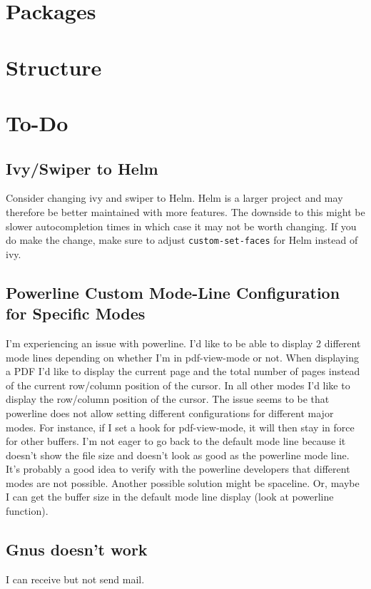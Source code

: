 \documentclass{default}
\begin{document}
\tableofcontents
\hypersetup{linkcolor=red}

\chapter{Packages}\label{cha:packages}


\chapter{Structure}\label{cha:structure}


\chapter{To-Do}\label{cha:to-do}

\section{Ivy/Swiper to Helm}\label{sec:ivyswiper-helm}

Consider changing ivy and swiper to Helm. Helm is a larger project and may therefore be better
maintained with more features. The downside to this might be slower autocompletion times in which
case it may not be worth changing. If you do make the change, make sure to adjust
\lstinline{custom-set-faces} for Helm instead of ivy.


\section{Powerline Custom Mode-Line Configuration for Specific Modes}
\label{sec:powerl-cust-mode}

I'm experiencing an issue with powerline. I'd like to be able to display 2 different mode lines
depending on whether I'm in pdf-view-mode or not. When displaying a PDF I'd like to display the
current page and the total number of pages instead of the current row/column position of the
cursor. In all other modes I'd like to display the row/column position of the cursor. The issue
seems to be that powerline does not allow setting different configurations for different major
modes. For instance, if I set a hook for pdf-view-mode, it will then stay in force for other
buffers. I'm not eager to go back to the default mode line because it doesn't show the file size and
doesn't look as good as the powerline mode line. It's probably a good idea to verify with the
powerline developers that different modes are not possible. Another possible solution might be
spaceline. Or, maybe I can get the buffer size in the default mode line display (look at powerline
function).


\section{Gnus doesn't work}
\label{sec:gnus-doesnt-work}

I can receive but not send mail.
\end{document}
